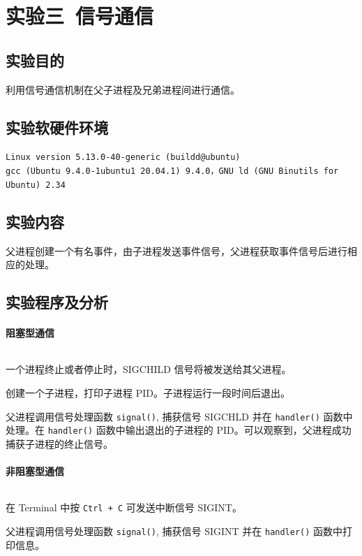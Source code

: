 \documentclass{article}
\begin{document}
	\section{实验三\ 信号通信}
		\subsection{实验目的}
			利用信号通信机制在父子进程及兄弟进程间进行通信。

		\subsection{实验软硬件环境}
			\texttt{Linux version 5.13.0-40-generic (buildd@ubuntu) \\ gcc (Ubuntu 9.4.0-1ubuntu1~20.04.1) 9.4.0，GNU ld (GNU Binutils for Ubuntu) 2.34}

		\subsection{实验内容}
			父进程创建一个有名事件，由子进程发送事件信号，父进程获取事件信号后进行相应的处理。

		\subsection{实验程序及分析}
			\paragraph*{阻塞型通信}
				\inputminted[linenos,breaklines,tabsize=4]{c}{lib3/lib3_1.c}

				一个进程终止或者停止时，SIGCHILD 信号将被发送给其父进程。

				创建一个子进程，打印子进程 PID。子进程运行一段时间后退出。

				父进程调用信号处理函数 \texttt{signal()}, 捕获信号 SIGCHLD 并在 \texttt{handler()} 函数中处理。在 \texttt{handler()} 函数中输出退出的子进程的 PID。可以观察到，父进程成功捕获子进程的终止信号。

			\paragraph*{非阻塞型通信}
				\inputminted[linenos,breaklines,tabsize=4]{c}{lib3/lib3_2.c}

				在 Terminal 中按 \texttt{Ctrl + C} 可发送中断信号 SIGINT。

				父进程调用信号处理函数 \texttt{signal()}, 捕获信号 SIGINT 并在 \texttt{handler()} 函数中打印信息。
\end{document}
